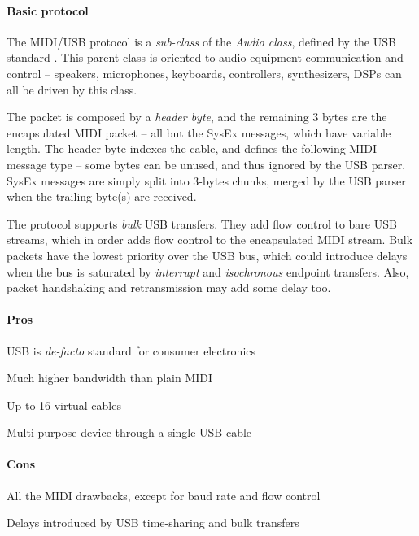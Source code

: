 \documentclass[a4paper,10pt]{article}
\begin{document}
\begin{multicols}{2}
\paragraph{Basic protocol}
The MIDI/USB protocol is a \emph{sub-class} of the \emph{Audio class}, defined
by the USB standard \cite{usb_docs}. This parent class is oriented to audio
equipment communication and control -- speakers, microphones, keyboards,
controllers, synthesizers, DSPs can all be driven by this class.

The packet is composed by a \emph{header byte}, and the remaining 3 bytes are
the encapsulated MIDI packet -- all but the SysEx messages, which have variable
length. The header byte indexes the cable, and defines the following MIDI
message type -- some bytes can be unused, and thus ignored by the USB parser.
SysEx messages are simply split into 3-bytes chunks, merged by the USB parser
when the trailing byte(s) are received.

The protocol supports \emph{bulk} USB transfers. They add flow control to bare
USB streams, which in order adds flow control to the encapsulated MIDI stream.
Bulk packets have the lowest priority over the USB bus, which could introduce
delays when the bus is saturated by \emph{interrupt} and \emph{isochronous}
endpoint transfers. Also, packet handshaking and retransmission may add
some delay too.


\paragraph{Pros}
\begin{itemize*}
	\item USB is \emph{de-facto} standard for consumer electronics
	\item Much higher bandwidth than plain MIDI
	\item Up to 16 virtual cables
	\item Multi-purpose device through a single USB cable
\end{itemize*}


\paragraph{Cons}
\begin{itemize*}
	\item All the MIDI drawbacks, except for baud rate and flow control
	\item Delays introduced by USB time-sharing and bulk transfers
\end{itemize*}



\end{multicols}
\end{document}
